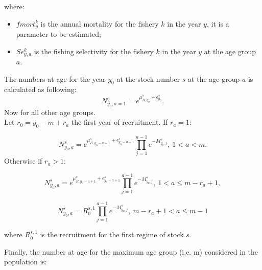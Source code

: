 \documentclass{article}
\begin{document}
where:
\begin{itemize}

    
    \item $fmort^k_y$ is the annual mortality for the fishery $k$ in the year $y$, it is a parameter to be estimated;
    \item $Se^k_{y,a}$ is the fishing selectivity for the fishery $k$ in the year $y$ at the age group $a$.

\end{itemize}

\hfill

The numbers at age for the year $y_0$ at the stock number $s$ at the age group  $a$ is calculated as following:
\begin{equation}
N^s_{y_0,a=1}=e^{\mu^s_{R,y_0} + \epsilon^s_{y_0}}.
\end{equation}
Now for all other age groups.\\
    Let $r_0 = y_0-m+r_a$ the first year of recruitment. If $r_a=1$:

\begin{equation}
N^s_{y_0,a}=e^{\mu_{R,y_0-a+1}^s + \epsilon^s_{y_0-a+1}}
            \prod_{j=1}^{a-1}e^{-M^s_{y_0,j}}, \ 1<a<m.
\end{equation}
Otherwise if $r_a>1$:

\begin{equation}
N^s_{y_0,a}=e^{\mu_{R,y_0-a+1}^s + \epsilon^s_{y_0-a+1}}                          \prod_{j=1}^{a-1}e^{-M^s_{y_0,j}}, \ 1<a\leq m-r_a+1,
\end{equation}

\begin{equation}
N^s_{y_0,a}=R_0^{s,1}\prod_{j=1}^{a-1}e^{-M^s_{y_0,j}}, \ m-r_a+1<a\leq m-1
\end{equation}

where $R_0^{s,1}$ is the recruitment for the first regime of stock $s$.

Finally, the number at age for the maximum age group (i.e. m) considered in the population is:
\end{document}
